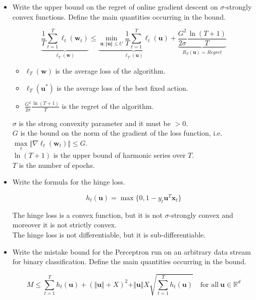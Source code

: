 \begin{itemize}
    \item Write the upper bound on the regret of online gradient descent on $\sigma$-strongly convex functions. Define the main quantities occurring in the bound.

        $$
        \underbrace{\frac{1}{T} \sum_{t=1}^{T} \ell_{t}(\boldsymbol{w}_{t})}_{\ell_T(\boldsymbol{w})} \leq \underbrace{\min_{\boldsymbol{u} : \Vert \boldsymbol{u} \Vert \leq U} \frac{1}{T} \sum_{t=1}^{T} \ell_{t}(\boldsymbol{u})}_{\ell_T(\boldsymbol{u})} + \underbrace{\frac{G^2}{2\sigma} \frac{\ln({T + 1})}{T}}_{R_T(\boldsymbol{u}) = Regret}
        $$

        \begin{itemize}
            \item $\ell_T(\boldsymbol{w})$ is the average loss of the algorithm.
            \item $\ell_T(\boldsymbol{u^*})$ is the average loss of the best fixed action.
            \item $\frac{G^2}{2\sigma} \frac{\ln({T + 1})}{T}$ is the regret of the algorithm.
        \end{itemize}
       
        $\sigma$ is the strong convexity parameter and it must be $> 0$.\\
        $G$ is the bound on the norm of the gradient of the loss function, i.e. $\underset{t}{\max} \Vert \nabla \ell_{t}(\boldsymbol{w}_{t}) \Vert \leq G$.\\
        $\ln(T + 1)$ is the upper bound of harmonic series over $T$.\\
        $T$ is the number of epochs.


        \item Write the formula for the hinge loss.

        $$
        h_{t}(\boldsymbol{u}) = \max\{0, 1 - y_{t} \boldsymbol{u}^T \boldsymbol{x}_{t}\}
        $$

        The hinge loss is a convex function, but it is not $\sigma$-strongly convex and moreover it is not strictly convex.\\
        The hinge loss is not differentiable, but it is sub-differentiable.\\

        \item Write the mistake bound for the Perceptron run on an arbitrary data stream for binary classification. Define the main quantities occurring in the bound.
        
            $$
            M \leq \sum_{t=1}^{T} h_{t}(\boldsymbol{u}) + (\Vert \boldsymbol{u} \Vert + X)^2 + \Vert \boldsymbol{u} \Vert X \sqrt{\sum_{t=1}^{T}h_t (\boldsymbol{u})} \quad \text{for all}\ \boldsymbol{u} \in \mathbb{R}^d    
            $$
            

\end{itemize}
